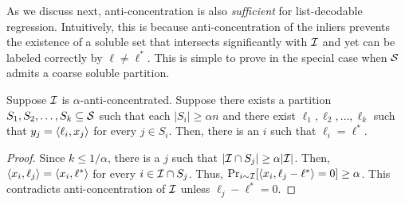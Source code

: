 
As we discuss next, anti-concentration is also \emph{sufficient} for list-decodable regression. Intuitively, this is because anti-concentration of the inliers prevents the existence of a soluble set that intersects significantly with $\mathcal I$ and yet can be labeled correctly by $\ell \neq \ell^*$. This is simple to prove in the special case when $\mathcal S$ admits a coarse soluble partition. 




\begin{proposition}
Suppose $\mathcal I$ is $\alpha$-anti-concentrated. Suppose there exists a partition $S_1, S_2,\ldots, S_k \subseteq \mathcal S$ such that each $|S_i| \geq \alpha n$ and there exist $\ell_1, \ell_2, \ldots, \ell_k$ such that $y_j = \langle\ell_i, x_j\rangle$ for every $j \in S_i$. Then, there is an $i$ such that $\ell_i = \ell^*$. \label{prop:simple-uniqueness-partition}
\end{proposition}

\begin{proof}
Since $k \leq 1/\alpha$, there is a $j$ such that $|\mathcal I \cap S_j| \geq \alpha |\mathcal I|$. 
Then, $\langle x_i, \ell_j\rangle= \langle x_i, \ell^*\rangle$ for every $i \in \mathcal I \cap S_j$. 
Thus, $\Pr_{i \sim \mathcal I}[\langle x_i,\ell_j-\ell^*\rangle = 0]\geq \alpha$. This contradicts anti-concentration of $\mathcal I$ unless $\ell_j - \ell^* = 0$.
\end{proof}

